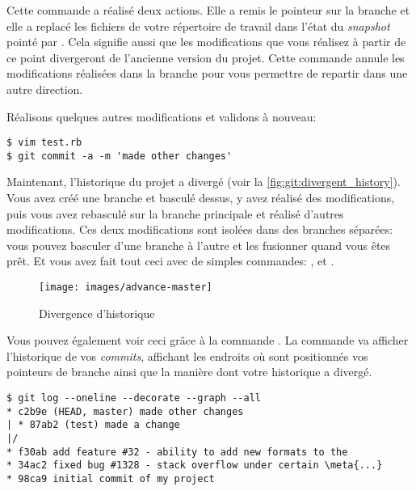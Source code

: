 Cette commande a réalisé deux actions.
Elle a remis le pointeur  sur la branche  et elle a replacé les fichiers de votre répertoire de travail dans l'état du \emph{snapshot} pointé par .
Cela signifie aussi que les modifications que vous réalisez à partir de ce point divergeront de l'ancienne version du projet.
Cette commande annule les modifications réalisées dans la branche  pour vous permettre de repartir dans une autre direction.


Réalisons quelques autres modifications et validons à nouveau:
\begin{Schunk}
\begin{Verbatim}
$ vim test.rb
$ git commit -a -m 'made other changes'
\end{Verbatim}
\end{Schunk}

Maintenant, l'historique du projet a divergé (voir la \autoref{fig:git:divergent_history}).
Vous avez créé une branche et basculé dessus, y avez réalisé des modifications, puis vous avez rebasculé sur la branche principale et réalisé d'autres modifications.
Ces deux modifications sont isolées dans des branches séparées: vous pouvez basculer d'une branche à l'autre et les fusionner quand vous êtes prêt.
Et vous avez fait tout ceci avec de simples commandes: ,  et .

\begin{figure}[H]
  \centering
  \texttt{[image: images/advance-master]}
  \caption{Divergence d'historique}
  \label{fig:git:divergent_history}
\end{figure}

Vous pouvez également voir ceci grâce à la commande .
La commande  va afficher l'historique de vos \emph{commits}, affichant les endroits où sont positionnés vos pointeurs de branche ainsi que la manière dont votre historique a divergé.
\begin{Schunk}
\begin{Verbatim}[commandchars=\\\{\}]
$ git log --oneline --decorate --graph --all
* c2b9e (HEAD, master) made other changes
| * 87ab2 (test) made a change
|/
* f30ab add feature #32 - ability to add new formats to the
* 34ac2 fixed bug #1328 - stack overflow under certain \meta{...}
* 98ca9 initial commit of my project
\end{Verbatim}
\end{Schunk}

